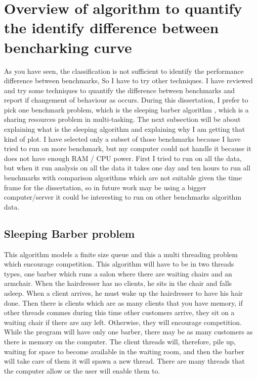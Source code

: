 \documentclass{article}
\begin{document}
\section{Overview of algorithm to quantify the identify difference between bencharking curve}

As you have seen, the classification is not sufficient to identify the performance difference between benchmarks, So I have to try other techniques. I have reviewed and try some techniques to quantify the difference between benchmarks and report if changement of behaviour as occurs. During this dissertation, I prefer to pick one benchmark problem, which is the sleeping barber algorithm \citep{reynolds2002linda}, which is a sharing resources problem in multi-tasking. The next subsection will be about explaining what is the sleeping algorithm and explaining why I am getting that kind of plot. I have selected only a subset of those benchmarks because I have tried to run on more benchmark, but my computer could not handle it because it does not have enough RAM / CPU power. First I tried to run on all the data, but when it run analysis on all the data it takes one day and ten hours to run all benchmarks with comparison algorithms which are not suitable given the time frame for the dissertation, so in future work may be using a bigger computer/server it could be interesting to run on other benchmarks algorithm data.

\subsection{Sleeping Barber problem}
This algorithm models a finite size queue and this a multi threading problem which encourage competition.
This algorithm will have to be in two threads types, one barber which runs a salon where there are waiting chairs and an armchair. When the hairdresser has no clients, he sits in the chair and falls asleep. When a client arrives, he must wake up the hairdresser to have his hair done. Then there is clients which are as many clients that you have memory, if other threads commes during this time other customers arrive, they sit on a waiting chair if there are any left. Otherwise, they will encourage competition.
While the program will have only one barber, there may be as many customers as there is memory on the computer. The client threads will, therefore, pile up, waiting for space to become available in the waiting room, and then the barber will take care of them it will spawn a new thread. There are many threads that the computer allow or the user will enable them to.
\end{document}
